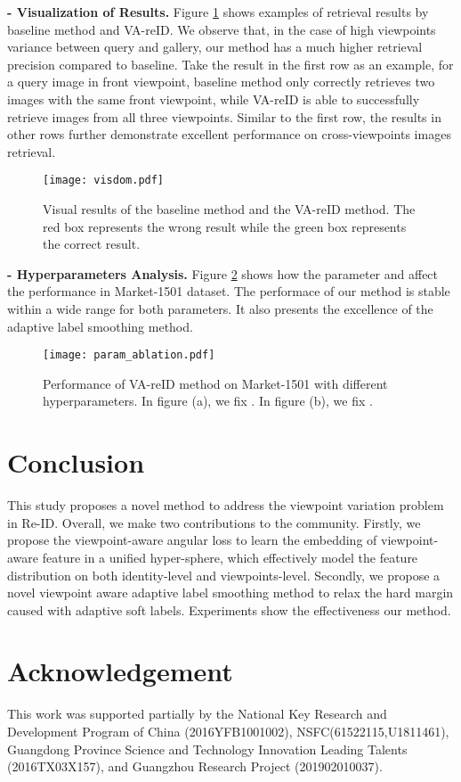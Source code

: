 \documentclass[letterpaper]{article} \usepackage{aaai20}  \usepackage{times}  \usepackage{helvet} \usepackage{courier}  \usepackage[hyphens]{url}  \usepackage{graphicx} \usepackage{array}
\begin{document}
\noindent \textbf{ - Visualization of Results.}
Figure \ref{fig:visdom} shows examples of retrieval results by baseline method and VA-reID. We observe that, in the case of high viewpoints variance between query and gallery, our method has a much higher retrieval precision compared to baseline. Take the result in the first row as an example, for a query image in front viewpoint, baseline method only correctly retrieves two images with the same front viewpoint, while VA-reID is able to successfully retrieve images from all three viewpoints. Similar to the first row, the results in other rows further demonstrate excellent performance on cross-viewpoints images retrieval. 


\begin{figure}[!t]
\centering
\texttt{[image: visdom.pdf]} 
\caption{Visual results of the baseline method and the VA-reID method. The red box represents the wrong result while the green box represents the correct result.} \label{fig:visdom}
\end{figure}



\noindent \textbf{ - Hyperparameters Analysis.}
Figure \ref{fig:ablation} shows how the parameter  and  affect the performance in Market-1501 dataset. The performace of our method is stable within a wide range for both parameters. It also presents the excellence of the adaptive label smoothing method.

\begin{figure}[!h]
\centering
\texttt{[image: param\_ablation.pdf]} \caption{Performance of VA-reID method on Market-1501 with different hyperparameters. In figure (a), we fix . In figure (b), we fix .}
\label{fig:ablation}
\end{figure}


\section{Conclusion}
This study proposes a novel method to address the viewpoint variation problem in Re-ID. Overall, we make two contributions to the community. Firstly, we propose the viewpoint-aware angular loss to learn the embedding of viewpoint-aware feature in a unified hyper-sphere, which effectively model the feature distribution on both identity-level and viewpoints-level. Secondly, we propose a novel viewpoint aware adaptive label smoothing method to relax the hard margin caused with adaptive soft labels. Experiments show the effectiveness our method. 

\section{Acknowledgement}
This work was supported partially by the National Key Research and Development Program of China (2016YFB1001002), NSFC(61522115,U1811461), Guangdong Province Science and Technology Innovation Leading Talents (2016TX03X157), and Guangzhou Research Project (201902010037). 




\end{document}
